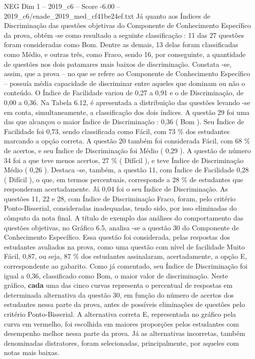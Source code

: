 \begin{textsample}{NEG Dim 1 – 2019\_c6 – Score -6.00 – 2019\_c6/enade\_2019\_med\_cf41be24ef.txt}
Já quanto aos Índices de Discriminação das questões objetivas do Componente de Conhecimento Específico da prova, obtém -se como resultado a seguinte classificação : 11 das 27 questões foram consideradas como Bom.
Dentre as demais, 13 delas foram classificadas como Médio, e outras três, como Fraco, sendo 16, por conseguinte, a quantidade de questões nos dois patamares mais baixos de discriminação.
Constata -se, assim, que a prova – no que se refere ao Componente de Conhecimento Específico – possuía média capacidade de discriminar entre aqueles que dominam ou não o conteúdo.
O Índice de Facilidade variou de 0,27 a 0,91 e o de Discriminação, de 0,00 a 0,36.
Na Tabela 6.12, é apresentada a distribuição das questões levando -se em conta, simultaneamente, a classificação dos dois índices.
A questão 29 foi uma das que alcançou o maior Índice de Discriminação : 0,36 ( Bom ).
Seu Índice de Facilidade foi 0,73, sendo classificada como Fácil, com 73 \% dos estudantes marcando a opção correta.
A questão 20 também foi considerada Fácil, com 68 \% de acertos, e seu Índice de Discriminação foi Médio ( 0,29 ).
A questão de número 34 foi a que teve menos acertos, 27 \% ( Difícil ), e teve Índice de Discriminação Médio ( 0,26 ).
Destaca -se, também, a questão 11, com Índice de Facilidade 0,28 ( Difícil ), o que, em termos percentuais, corresponde a 28 \% de estudantes que responderam acertadamente.
Já 0,04 foi o seu Índice de Discriminação.
As questões 11, 22 e 28, com Índice de Discriminação Fraco, foram, pelo critério Ponto-Bisserial, consideradas inadequadas, tendo sido, por isso eliminadas do cômputo da nota final.
A título de exemplo das análises do comportamento das questões objetivas, no Gráfico 6.5, analisa -se a questão 30 do Componente de Conhecimento Específico.
Essa questão foi considerada, pelas respostas dos estudantes avaliados na prova, como uma questão com nível de facilidade Muito Fácil, 0,87, ou seja, 87 \% dos estudantes assinalaram, acertadamente, a opção E, correspondente ao gabarito.
Como já comentado, seu Índice de Discriminação foi igual a 0,36, classificado como Bom, o maior valor de discriminação.
Neste gráfico, \textbf{cada} uma das cinco curvas representa o percentual de respostas em determinada alternativa da questão 30, em função do número de acertos dos estudantes nessa parte da prova, antes de possíveis eliminações de questões pelo critério Ponto-Bisserial.
A alternativa correta E, representada no gráfico pela curva em vermelho, foi escolhida em maiores proporções pelos estudantes com desempenho melhor nessa parte da prova.
Já as alternativas incorretas, também denominadas distratores, foram selecionadas, principalmente, por aqueles com notas mais baixas.

\end{textsample}
